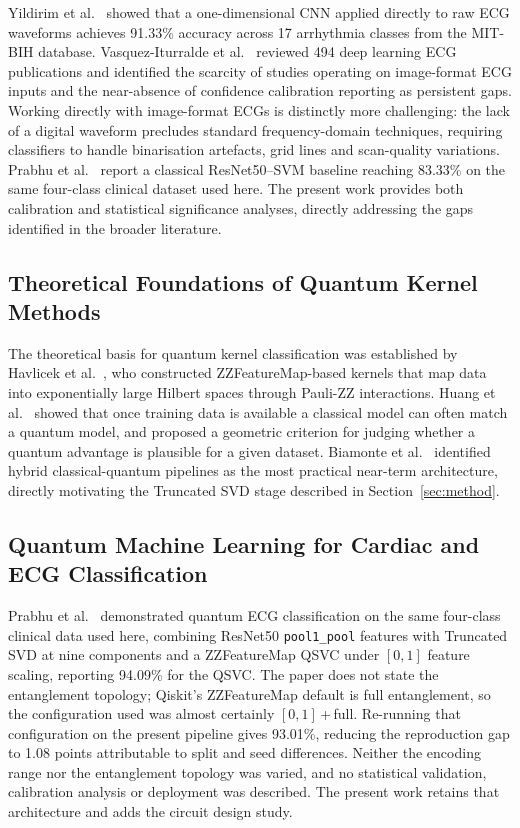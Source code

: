\documentclass[10pt,conference]{IEEEtran}
\begin{document}
Yildirim et al.~\cite{yildirim2018} showed that a one-dimensional CNN
applied directly to raw ECG waveforms achieves 91.33\% accuracy across
17 arrhythmia classes from the MIT-BIH database. Vasquez-Iturralde
et al.~\cite{vasquez2024} reviewed 494 deep learning ECG publications
and identified the scarcity of studies operating on image-format ECG
inputs and the near-absence of confidence calibration reporting as
persistent gaps. Working directly with image-format ECGs is distinctly
more challenging: the lack of a digital waveform precludes standard
frequency-domain techniques, requiring classifiers to handle
binarisation artefacts, grid lines and scan-quality variations.
Prabhu et al.~\cite{prabhu2023} report a classical ResNet50--SVM
baseline reaching 83.33\% on the same four-class clinical dataset used
here. The present work provides both calibration and statistical
significance analyses, directly addressing the gaps identified in the
broader literature.

\subsection{Theoretical Foundations of Quantum Kernel Methods}

The theoretical basis for quantum kernel classification was established
by Havlicek et al.~\cite{havlicek2019}, who constructed
ZZFeatureMap-based kernels that map data into exponentially large
Hilbert spaces through Pauli-ZZ interactions. Huang et al.~\cite{huang2021}
showed that once training data is available a classical model can often
match a quantum model, and proposed a geometric criterion for judging
whether a quantum advantage is plausible for a given dataset. Biamonte
et al.~\cite{biamonte2017} identified hybrid classical-quantum pipelines
as the most practical near-term architecture, directly motivating the
Truncated SVD stage described in Section~\ref{sec:method}.

\subsection{Quantum Machine Learning for Cardiac and ECG Classification}

Prabhu et al.~\cite{prabhu2023} demonstrated quantum ECG classification
on the same four-class clinical data used here, combining ResNet50
\texttt{pool1\_pool} features with Truncated SVD at nine components and
a ZZFeatureMap QSVC under $[0,1]$ feature scaling, reporting 94.09\%
for the QSVC. The paper does not state the entanglement topology;
Qiskit's ZZFeatureMap default is full entanglement, so the configuration
used was almost certainly $[0,1]$\,+\,full. Re-running that
configuration on the present pipeline gives 93.01\%, reducing the
reproduction gap to 1.08 points attributable to split and seed
differences. Neither the encoding range nor the entanglement topology
was varied, and no statistical validation, calibration analysis or
deployment was described. The present work retains that architecture and
adds the circuit design study.
\end{document}
